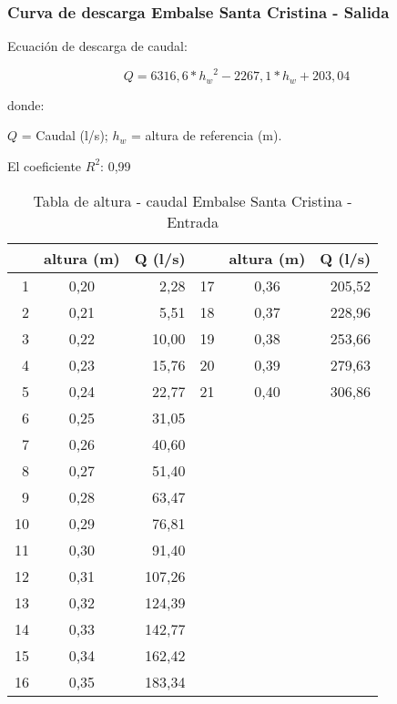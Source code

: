 \documentclass[]{article}
\begin{document}
\subsubsection{Curva de descarga Embalse Santa Cristina - Salida}\label{CD Embalse Santa Cristina - Salida}

Ecuación de descarga de caudal:

\[Q = 6316,6* {{h_w}^2} - 2267,1* h_w + 203,04\]

donde:

\(Q\) = Caudal (l/s); \(h_w\) = altura de referencia (m).

El coeficiente \(R^2\): 0,99


\begin{table}[H]

\caption{Tabla de altura - caudal Embalse Santa Cristina - Entrada}
\centering

\begin{center}
\begingroup\fontsize{10pt}{11pt}\selectfont
\begin{tabular}{rcrrcr}
  \hline
 & altura (m) & Q (l/s) &  & altura (m) & Q (l/s) \\ 
  \hline
  1 & 0,20 & 2,28 &  17 & 0,36 & 205,52 \\ 
    2 & 0,21 & 5,51 &  18 & 0,37 & 228,96 \\ 
    3 & 0,22 & 10,00 &  19 & 0,38 & 253,66 \\ 
    4 & 0,23 & 15,76 &  20 & 0,39 & 279,63 \\ 
    5 & 0,24 & 22,77 &  21 & 0,40 & 306,86 \\ 
    6 & 0,25 & 31,05 &  &  &  \\ 
    7 & 0,26 & 40,60 &  &  &  \\ 
    8 & 0,27 & 51,40 &  &  &  \\ 
    9 & 0,28 & 63,47 &  &  &  \\ 
   10 & 0,29 & 76,81 &  &  &  \\ 
   11 & 0,30 & 91,40 &  &  &  \\ 
   12 & 0,31 & 107,26 &  &  &  \\ 
   13 & 0,32 & 124,39 &  &  &  \\ 
   14 & 0,33 & 142,77 &  &  &  \\ 
   15 & 0,34 & 162,42 &  &  &  \\ 
   16 & 0,35 & 183,34 &  &  &  \\ 
   \hline
\end{tabular}
\endgroup\end{center}
\end{table}
\end{document}
